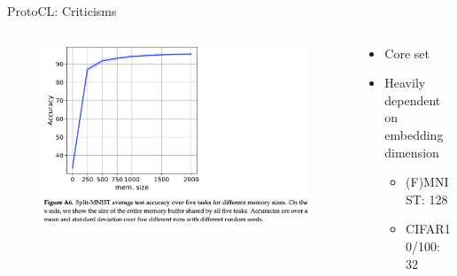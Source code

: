 \documentclass[12pt,aspectratio=169, handout]{beamer}
\let\olditem\item
\renewcommand\item{\olditem\justifying}
\begin{document}
\begin{frame}{ProtoCL: Criticisms}
\begin{columns}
    \begin{column}{0.6\textwidth}
        \begin{figure}
		\centering
		\includegraphics[width=\textwidth]{"images/FigA6_full.png"}
	\end{figure}
    \end{column}
    \begin{column}{0.4\textwidth}
        \begin{itemize}[<+->]
            \item Core set %
            \item Heavily dependent on embedding dimension
            \begin{itemize}
                \item (F)MNIST: 128
                \item CIFAR10/100: 32
            \end{itemize}
        \end{itemize}
    \end{column}
    
    
\end{columns}
    
\end{frame}
\end{document}
